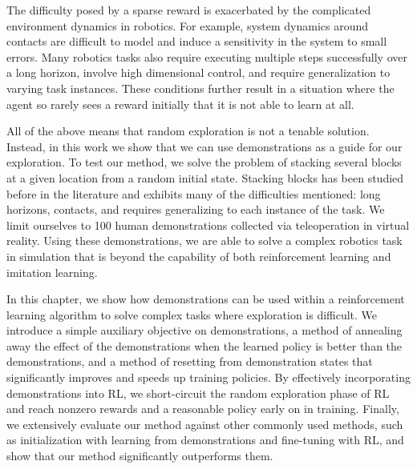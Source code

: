 The difficulty posed by a sparse reward is exacerbated by the complicated environment dynamics in robotics. For example, system dynamics around contacts are difficult to model and induce a sensitivity in the system to small errors. Many robotics tasks also require executing multiple steps successfully over a long horizon, involve high dimensional control, and require generalization to varying task instances. These conditions further result in a situation where the agent so rarely sees a reward initially that it is not able to learn at all.

All of the above means that random exploration is not a tenable solution. Instead, in this work we show that we can use demonstrations as a guide for our exploration. To test our method, we solve the problem of stacking several blocks at a given location from a random initial state. Stacking blocks has been studied before in the literature \citep{deisenroth2011blocks, duan2017oneshotimitation} and exhibits many of the difficulties mentioned: long horizons, contacts, and requires generalizing to each instance of the task. We limit ourselves to 100 human demonstrations collected via teleoperation in virtual reality. Using these demonstrations, we are able to solve a complex robotics task in simulation that is beyond the capability of both reinforcement learning and imitation learning.

In this chapter, we show how demonstrations can be used within a reinforcement learning algorithm to solve complex tasks where exploration is difficult. We introduce a simple auxiliary objective on demonstrations, a method of annealing away the effect of the demonstrations when the learned policy is better than the demonstrations, and a method of resetting from demonstration states that significantly improves and speeds up training policies.
By effectively incorporating demonstrations into RL, we short-circuit the random exploration phase of RL and reach nonzero rewards and a reasonable policy early on in training. Finally, we extensively evaluate our method against other commonly used methods, such as initialization with learning from demonstrations and fine-tuning with RL, and show that our method significantly outperforms them.

